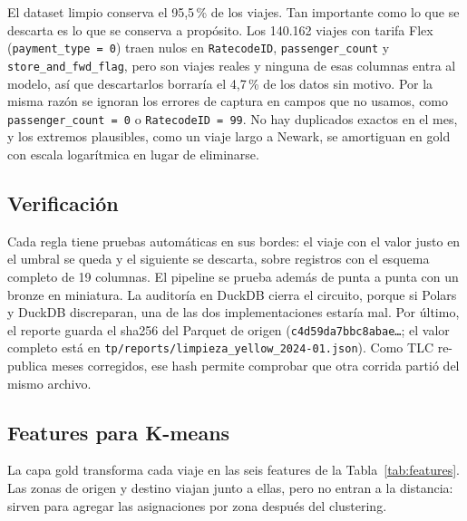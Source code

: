 El dataset limpio conserva el 95,5\,\% de los viajes. Tan importante como lo que se descarta es lo
que se conserva a propósito. Los 140.162 viajes con tarifa Flex (\texttt{payment\_type = 0}) traen
nulos en \texttt{RatecodeID}, \texttt{passenger\_count} y \texttt{store\_and\_fwd\_flag}, pero son
viajes reales y ninguna de esas columnas entra al modelo, así que descartarlos borraría el 4,7\,\%
de los datos sin motivo. Por la misma razón se ignoran los errores de captura en campos que no
usamos, como \texttt{passenger\_count = 0} o \texttt{RatecodeID = 99}. No hay duplicados exactos en
el mes, y los extremos plausibles, como un viaje largo a Newark, se amortiguan en gold con escala
logarítmica en lugar de eliminarse.

\subsection{Verificación}

Cada regla tiene pruebas automáticas en sus bordes: el viaje con el valor justo en el umbral se
queda y el siguiente se descarta, sobre registros con el esquema completo de 19 columnas. El
pipeline se prueba además de punta a punta con un bronze en miniatura. La auditoría en DuckDB cierra
el circuito, porque si Polars y DuckDB discreparan, una de las dos implementaciones estaría mal.
Por último, el reporte guarda el sha256 del Parquet de origen (\texttt{c4d59da7bbc8abae\ldots}; el
valor completo está en \texttt{tp/reports/limpieza\_yellow\_2024-01.json}). Como TLC re-publica
meses corregidos, ese hash permite comprobar que otra corrida partió del mismo archivo.

\subsection{Features para K-means}

La capa gold transforma cada viaje en las seis features de la Tabla~\ref{tab:features}. Las zonas
de origen y destino viajan junto a ellas, pero no entran a la distancia: sirven para agregar las
asignaciones por zona después del clustering.

